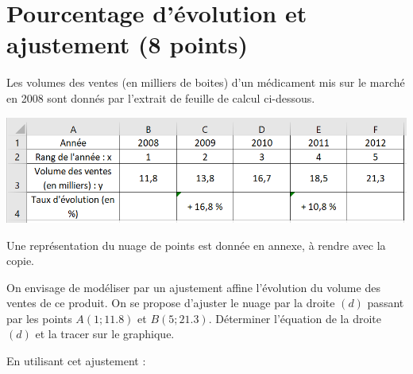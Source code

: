 \section{Pourcentage d'évolution et ajustement (8 points)}

Les volumes des ventes (en milliers de boites) d'un médicament mis sur le marché en 2008 sont donnés par l'extrait de feuille de calcul ci-dessous.

\begin{center}
	\includegraphics[scale=0.4]{tab}
\end{center}

Une représentation du nuage de points est donnée en annexe, à rendre avec la copie.

\begin{questions}
	\question 
	
	\question[3] On envisage de modéliser par un ajustement affine l'évolution du volume des ventes de ce produit. On se propose d'ajuster le nuage par la droite $(d)$ passant par les points  $A(1;\num{11.8})$ et $B(5;\num{21.3})$. Déterminer l'équation de la droite $(d)$ et la tracer sur le graphique.
		
	
	\question En utilisant cet ajustement :
\end{questions}

